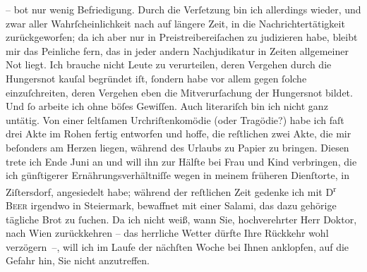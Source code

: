 \begin{ledgroupsized}[t]{13cm}
                    – bot nur wenig Befriedigung.\pend
           \pstart
           Durch die Verſetzung bin ich allerdings wieder, und zwar aller Wahrſcheinlichkeit
                    nach auf längere Zeit, in die Nachrichtertätigkeit zurückgeworfen; da ich aber
                    nur in Preistreibereiſachen zu judizieren habe, bleibt mir das Peinliche fern,
                    das in jeder andern Nachjudikatur in Zeiten allgemeiner Not liegt. Ich brauche
                    nicht Leute zu verurteilen, deren Vergehen durch die Hungersnot kauſal begründet
                    iſt, ſondern habe vor allem gegen ſolche einzuſchreiten, deren Vergehen {\pb}eben die Mitverurſachung der Hungersnot bildet.
                    Und ſo arbeite ich ohne böſes Gewiſſen.\pend
           \pstart
           Auch literariſch bin ich nicht ganz untätig. Von einer ſeltſamen Urchriſtenkomödie (oder Tragödie?) habe
                    ich faſt drei Akte im Rohen fertig entworfen und hoffe, die reſtlichen zwei
                    Akte, die mir beſonders am Herzen liegen, während des Urlaubs zu Papier zu
                    bringen. Diesen trete ich Ende Juni an und will ihn zur Hälfte bei
                        Frau und Kind verbringen, die ich
                    günſtigerer Ernährungsverhältniſſe wegen in meinem früheren Dienſtorte, in Ziſtersdorf, angesiedelt habe; während der
                    reſtlichen Zeit gedenke ich mit D\textsuperscript{r}{ }\textsc{Beer} irgendwo in Steiermark, bewaffnet mit
                    einer Salami, das dazu gehörige tägliche {\pb}Brot zu
                    ſuchen.\pend
           \pstart
           Da ich nicht weiß, wann Sie, hochverehrter Herr Doktor, nach Wien zurückkehren – das herrliche Wetter dürfte Ihre
                    Rückkehr wohl verzögern –, will ich im Laufe der nächſten Woche bei Ihnen
                    anklopfen, auf die Gefahr hin, Sie nicht anzutreffen.\pend

\end{ledgroupsized}
